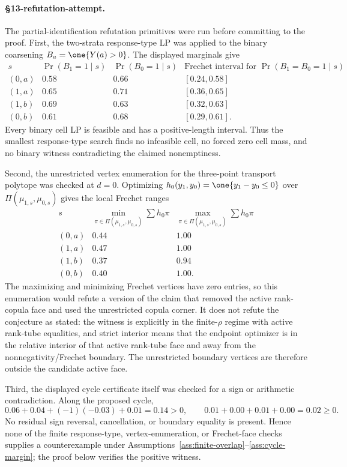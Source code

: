 \paragraph{\S13-refutation-attempt.}
The partial-identification refutation primitives were run before committing to the proof.  First, the two-strata response-type LP was applied to the binary coarsening \(B_a=\one\{Y(a)>0\}\).  The displayed marginals give
\[
\begin{array}{c|cc|c}
s & \Pr(B_1=1\mid s) & \Pr(B_0=1\mid s) &
\text{Frechet interval for }\Pr(B_1=B_0=1\mid s)\\ \hline
(0,a)&0.58&0.66&[0.24,0.58]\\
(1,a)&0.65&0.71&[0.36,0.65]\\
(1,b)&0.69&0.63&[0.32,0.63]\\
(0,b)&0.61&0.68&[0.29,0.61].
\end{array}
\]
Every binary cell LP is feasible and has a positive-length interval.  Thus the smallest response-type search finds no infeasible cell, no forced zero cell mass, and no binary witness contradicting the claimed nonemptiness.

Second, the unrestricted vertex enumeration for the three-point transport polytope was checked at \(d=0\).  Optimizing \(h_0(y_1,y_0)=\one\{y_1-y_0\le0\}\) over \(\Pi(\mu_{1,s},\mu_{0,s})\) gives the local Frechet ranges
\[
\begin{array}{c|cc}
s & \min_{\pi\in\Pi(\mu_{1,s},\mu_{0,s})}\sum h_0\pi
  & \max_{\pi\in\Pi(\mu_{1,s},\mu_{0,s})}\sum h_0\pi\\ \hline
(0,a)&0.44&1.00\\
(1,a)&0.47&1.00\\
(1,b)&0.37&0.94\\
(0,b)&0.40&1.00.
\end{array}
\]
The maximizing and minimizing Frechet vertices have zero entries, so this enumeration would refute a version of the claim that removed the active rank-copula face and used the unrestricted copula corner.  It does not refute the conjecture as stated: the witness is explicitly in the finite-\(\rho\) regime with active rank-tube equalities, and strict interior means that the endpoint optimizer is in the relative interior of that active rank-tube face and away from the nonnegativity/Frechet boundary.  The unrestricted boundary vertices are therefore outside the candidate active face.

Third, the displayed cycle certificate itself was checked for a sign or arithmetic contradiction.  Along the proposed cycle,
\[
0.06+0.04+(-1)(-0.03)+0.01=0.14>0,
\qquad
0.01+0.00+0.01+0.00=0.02\ge0.
\]
No residual sign reversal, cancellation, or boundary equality is present.  Hence none of the finite response-type, vertex-enumeration, or Frechet-face checks supplies a counterexample under Assumptions~\ref{ass:finite-overlap}--\ref{ass:cycle-margin}; the proof below verifies the positive witness.

